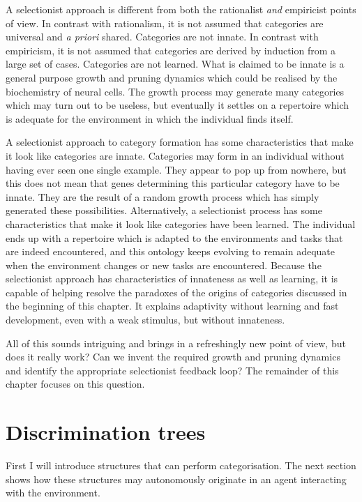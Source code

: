 A selectionist approach is different from 
both the rationalist {\itshape and} empiricist points of view.
In contrast with rationalism, it is not assumed that categories are
universal and {\itshape a priori} shared. Categories are not innate. 
In contrast with empiricism, it is not assumed that 
categories are derived by induction from a large 
set of cases. Categories are not learned. What is 
claimed to be innate is a general purpose growth and pruning
dynamics which could be realised by the biochemistry of
neural cells. The growth process may generate many categories 
which may turn out to 
be useless, but eventually it settles on a repertoire
which is adequate for the environment in which the 
individual finds itself. 

A selectionist approach to category formation has some 
characteristics that make it look like categories are 
innate. Categories may form in an individual
without having ever seen one single example. They
appear to pop up from nowhere, but this does not 
mean that genes determining this particular category have 
to be innate. They are the result of a random growth process
which has simply generated these possibilities. 
Alternatively, a selectionist process has some characteristics
that make it look like categories have been learned.
The individual ends up with a repertoire
which is adapted to 
the environments and tasks that are indeed encountered, and 
this ontology keeps evolving to remain adequate when 
the environment changes or new tasks are encountered. 
Because the selectionist approach has characteristics
of innateness as well as learning, it is capable of helping
resolve the 
paradoxes of the origins of categories discussed in the 
beginning of this chapter.  
It explains adaptivity without learning and fast 
development, even with a weak stimulus, but without innateness. 

All of this sounds intriguing and brings in a refreshingly new 
point of view, but does it really work? Can we 
invent the required growth and pruning dynamics and 
identify the appropriate selectionist feedback loop? 
The remainder of this chapter focuses on this question. 

\section{Discrimination trees}

First I will introduce structures that can perform
categorisation. The next section shows how these
structures may autonomously originate in an agent
interacting with the environment. %

